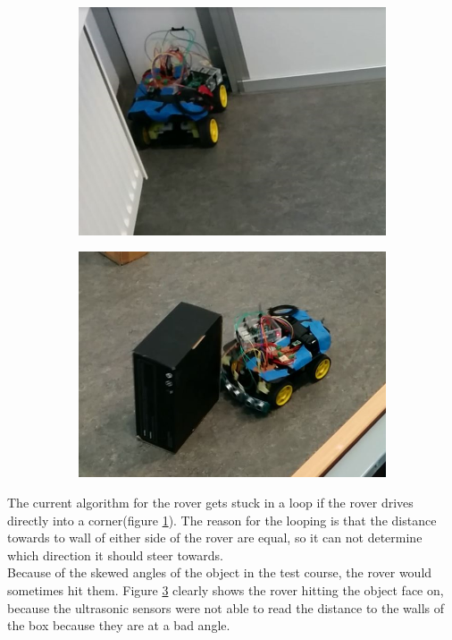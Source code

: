 \begin{figure}[H]
	\centering
	\begin{subfigure}[H]{0.4\textwidth}
		\includegraphics[width=\textwidth]{images/test-stuckincorner.jpg}
		\label{corner}
	\end{subfigure}%
	\quad
	\begin{subfigure}[H]{0.4\textwidth}
		\includegraphics[width=\textwidth]{images/test-badmeasuringangle.jpg}
		\label{badangle}
	\end{subfigure}
\end{figure}

The current algorithm for the rover gets stuck in a loop if the rover drives directly into a corner(figure \ref{corner}). The reason for the looping is that the distance towards to wall of either side of the rover are equal, so it can not determine which direction it should steer towards.\\
Because of the skewed angles of the object in the test course, the rover would sometimes hit them. Figure \ref{badangle} clearly shows the rover hitting the object face on, because the ultrasonic sensors were not able to read the distance to the walls of the box because they are at a bad angle.

